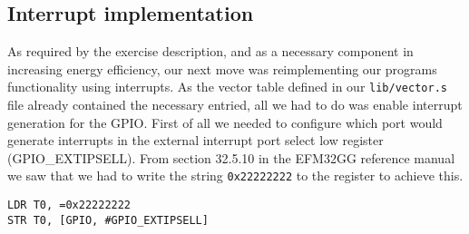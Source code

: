 \subsection{Interrupt implementation}
\label{sec:interrupt-implementation}

As required by the exercise description, and as a necessary component in increasing energy efficiency, our next move was reimplementing our programs functionality using interrupts. As the vector table defined in our \texttt{lib/vector.s} file already contained the necessary entried, all we had to do was enable interrupt generation for the GPIO. First of all we needed to configure which port would generate interrupts in the external interrupt port select low register (GPIO\_EXTIPSELL). From section 32.5.10 in the EFM32GG reference manual \cite{efm32ggref} we saw that we had to write the string \texttt{0x22222222} to the register to achieve this.

\begin{lstlisting}[label=interrupt-port-select, caption=Configuring GPIO\_EXTIPSELL]
LDR T0, =0x22222222
STR T0, [GPIO, #GPIO_EXTIPSELL]
\end{lstlisting}
